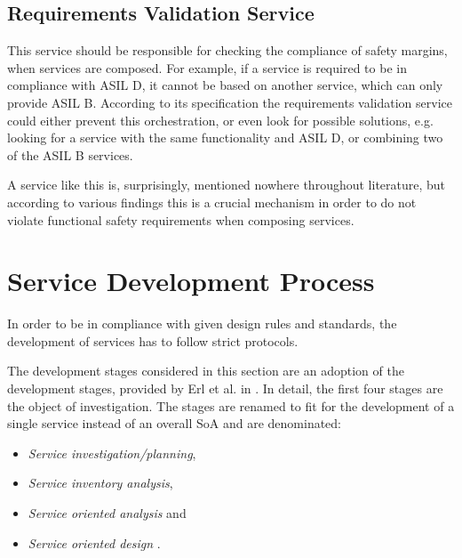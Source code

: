 \subsection{Requirements Validation Service}

This service should be responsible for checking the compliance of safety margins, when services are composed. For example, if a service is required to be in compliance with ASIL D, it cannot be based on another service, which can only provide ASIL B. According to its specification the requirements validation service could either prevent this orchestration, or even look for possible solutions, e.g. looking for a service with the same functionality and ASIL D, or combining two of the ASIL B services.

A service like this is, surprisingly, mentioned nowhere throughout literature, but according to various findings this is a crucial mechanism in order to do not violate functional safety requirements when composing services.








\section{Service Development Process}
\label{sec:service-development-process}
In order to be in compliance with given design rules and standards, the development of services has to follow strict protocols.

The development stages considered in this section are an adoption of the development stages, provided by Erl et al. in \cite[p.116]{erl2011}. In detail, the first four stages are the object of investigation. The stages are renamed to fit for the development of a single service instead of an overall SoA and are denominated:
\begin{itemize}
\item \emph{Service investigation/planning},
\item \emph{Service inventory analysis},
\item \emph{Service oriented analysis} and
\item \emph{Service oriented design} \cite[p.116]{erl2011}.
\end{itemize}


